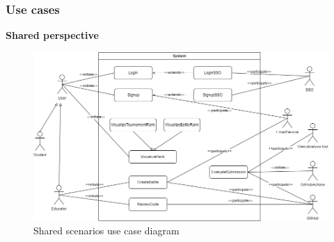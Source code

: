 \subsubsection{Use cases}
\textbf{Shared perspective}
\begin{figure}[H]
    \hspace{-40px}
    \includegraphics[scale=0.5]{Diagrams/use_case_both.png}
    \caption{Shared scenarios use case diagram}
\end{figure}
